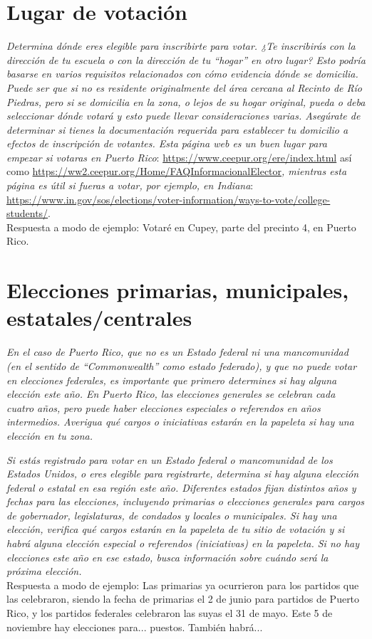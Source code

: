 \documentclass[11pt]{article} %
\begin{document}
\section{Lugar de votación}
\textit{Determina dónde eres elegible para inscribirte para votar. ¿Te inscribirás con la dirección de tu escuela o con la dirección de tu ``hogar'' en otro lugar? Esto podría basarse en varios requisitos relacionados con cómo evidencia dónde se domicilia. Puede ser que si no es residente originalmente del área cercana al Recinto de Río Piedras, pero si se domicilia en la zona, o lejos de su hogar original, pueda o deba seleccionar dónde votará y esto puede llevar consideraciones varias. Asegúrate de determinar si tienes la documentación requerida para establecer tu domicilio a efectos de inscripción de votantes. Esta página web es un buen lugar para empezar si votaras en Puerto Rico}: \url{https://www.ceepur.org/ere/index.html} así como \url{https://ww2.ceepur.org/Home/FAQInformacionalElector}\textit{, mientras esta página es útil si fueras a votar, por ejemplo, en Indiana}: \url{https://www.in.gov/sos/elections/voter-information/ways-to-vote/college-students/}.
\\
Respuesta a modo de ejemplo: Votaré en Cupey, parte del precinto 4, en Puerto Rico.

\section{Elecciones primarias, municipales, estatales/centrales}

\textit{En el caso de Puerto Rico, que no es un Estado federal ni una mancomunidad (en el sentido de ``Commonwealth'' como estado federado), y que no puede votar en elecciones federales, es importante que primero determines si hay alguna elección este año. En Puerto Rico, las elecciones generales se celebran cada cuatro años, pero puede haber elecciones especiales o referendos en años intermedios. Averigua qué cargos o iniciativas estarán en la papeleta si hay una elección en tu zona.}

\textit{Si estás registrado para votar en un Estado federal o mancomunidad de los Estados Unidos, o eres elegible para registrarte, determina si hay alguna elección federal o estatal en esa región este año. Diferentes estados fijan distintos años y fechas para las elecciones, incluyendo primarias o elecciones generales para cargos de gobernador, legislaturas, de condados y locales o municipales. Si hay una elección, verifica qué cargos estarán en la papeleta de tu sitio de votación y si habrá alguna elección especial o referendos (iniciativas) en la papeleta. Si no hay elecciones este año en ese estado, busca información sobre cuándo será la próxima elección.}
\\
Respuesta a modo de ejemplo: Las primarias ya ocurrieron para los partidos que las celebraron, siendo la fecha de primarias el 2 de junio para partidos de Puerto Rico, y los partidos federales celebraron las suyas el 31 de mayo. Este 5 de noviembre hay elecciones para... puestos. También habrá...
\end{document}
